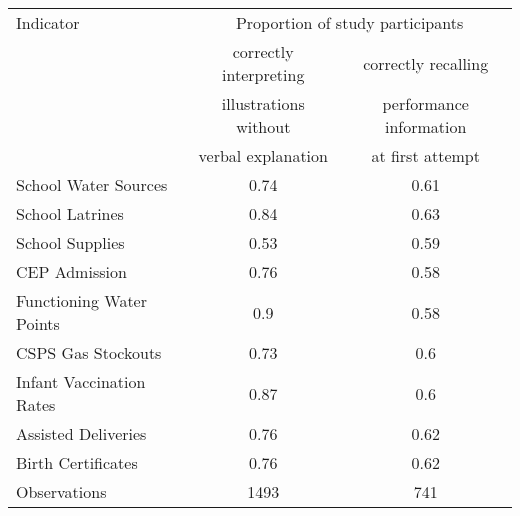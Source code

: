 
    \begin{center}
    \begin{tabular}{l c | c }
    \hline
    Indicator&\multicolumn{2}{c}{Proportion of study participants}\\
    &correctly interpreting&correctly recalling\\
    &illustrations without&performance information\\
    &verbal explanation&at first attempt\\
    \hline
    School Water Sources&0.74&0.61\\
    School Latrines&0.84&0.63\\
    School Supplies&0.53&0.59\\
    CEP Admission&0.76&0.58\\
    Functioning Water Points&0.9&0.58\\
    CSPS Gas Stockouts&0.73&0.6\\
    Infant Vaccination Rates&0.87&0.6\\
    Assisted Deliveries&0.76&0.62\\
    Birth Certificates&0.76&0.62\\
    Observations  &1493&741\\
    \hline\hline
    \end{tabular}
    \end{center}
    
